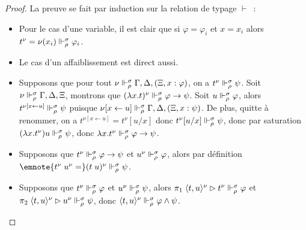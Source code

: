 \documentclass{article}
\begin{document}
\begin{proof}
  La preuve se fait par induction sur la relation de typage $\vdash$~:
  \begin{itemize}
  \item Pour le cas d'une variable, il est clair que si $\varphi = \varphi_i$ et $x = x_i$ alors $t^\nu = \nu(x_i)\Vdash_\rho^\sigma \varphi_i$.
  \item Le cas d'un affaiblissement est direct aussi.
  \item Supposons que pour tout $\nu \Vdash_\rho^\sigma \Gamma,\Delta,(\Xi, x : \varphi)$, on a $t^\nu \Vdash_\rho^\sigma \psi$. Soit $\nu \Vdash_\rho^\sigma \Gamma,\Delta,\Xi$, montrons que $(\lambda x.t)^\nu\Vdash_\rho^\sigma \varphi \to \psi$. Soit $u \Vdash_\rho^\sigma \varphi$, alors $t^{\nu[x \leftarrow u]}\Vdash_\rho^\sigma \psi$ puisque $\nu[x\leftarrow u]\Vdash_\rho^\sigma \Gamma,\Delta,(\Xi, x : \psi)$. De plus, quitte à renommer, on a $t^{\nu[x\leftarrow u]} = t^\nu[u/x]$ donc $t^\nu[u/x]\Vdash_\rho^\sigma \psi$, donc par saturation $(\lambda x.t^\nu) u \Vdash_\rho^\sigma \psi$, donc $\lambda x.t^\nu\Vdash_\rho^\sigma \varphi\to\psi$.
   \item Supposons que $t^\nu\Vdash_\rho^\sigma \varphi \to \psi$ et $u^\nu\Vdash_\rho^\sigma \varphi$, alors par définition $\emnote{t^\nu\;u^\nu=}(t\;u)^\nu\reali_\rho^\sigma \psi$.
  \item Supposons que $t^\nu\Vdash_\rho^\sigma \varphi$ et $u^\nu\Vdash_\rho^\sigma \psi$, alors $\pi_1\;\langle t,u\rangle^\nu \rhd t^\nu \Vdash_\rho^\sigma \varphi$ et $\pi_2\;\langle t,u\rangle^\nu\rhd u^\nu \Vdash_\rho^\sigma \psi$, donc $\langle t,u\rangle^\nu \Vdash_\rho^\sigma \varphi\land\psi$.
  

\end{itemize}
\end{proof}
\end{document}
